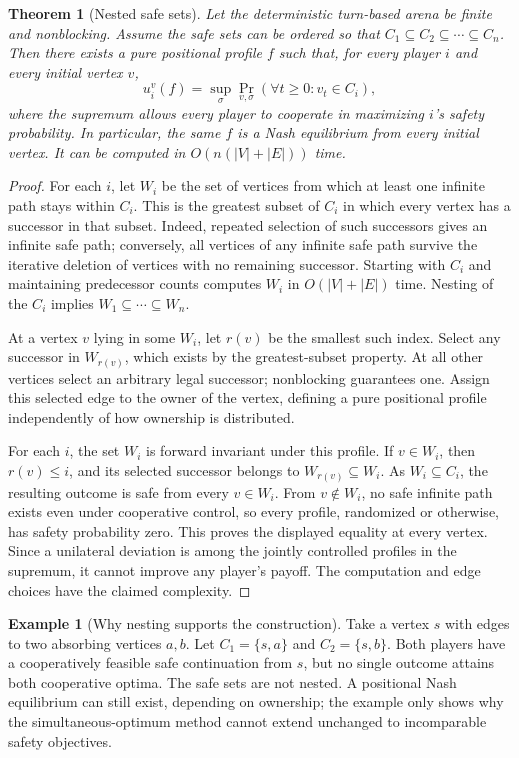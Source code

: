 \documentclass[11pt]{article}
\newtheorem{theorem}{Theorem}
\theoremstyle{definition}
\newtheorem{example}{Example}
\theoremstyle{remark}
\begin{document}
\begin{theorem}[Nested safe sets]
Let the deterministic turn-based arena be finite and nonblocking. Assume the safe sets can be ordered so that $C_1\subseteq C_2\subseteq\cdots\subseteq C_n$. Then there exists a pure positional profile $f$ such that, for every player $i$ and every initial vertex $v$,
\[
 u_i^v(f)=\sup_{\sigma}\Pr_{v,\sigma}(\forall t\geq0:v_t\in C_i),
\]
where the supremum allows every player to cooperate in maximizing $i$'s safety probability. In particular, the same $f$ is a Nash equilibrium from every initial vertex. It can be computed in $O(n(|V|+|E|))$ time.
\end{theorem}
\begin{proof}
For each $i$, let $W_i$ be the set of vertices from which at least one infinite path stays within $C_i$. This is the greatest subset of $C_i$ in which every vertex has a successor in that subset. Indeed, repeated selection of such successors gives an infinite safe path; conversely, all vertices of any infinite safe path survive the iterative deletion of vertices with no remaining successor. Starting with $C_i$ and maintaining predecessor counts computes $W_i$ in $O(|V|+|E|)$ time. Nesting of the $C_i$ implies $W_1\subseteq\cdots\subseteq W_n$.

At a vertex $v$ lying in some $W_i$, let $r(v)$ be the smallest such index. Select any successor in $W_{r(v)}$, which exists by the greatest-subset property. At all other vertices select an arbitrary legal successor; nonblocking guarantees one. Assign this selected edge to the owner of the vertex, defining a pure positional profile independently of how ownership is distributed.

For each $i$, the set $W_i$ is forward invariant under this profile. If $v\in W_i$, then $r(v)\leq i$, and its selected successor belongs to $W_{r(v)}\subseteq W_i$. As $W_i\subseteq C_i$, the resulting outcome is safe from every $v\in W_i$. From $v\notin W_i$, no safe infinite path exists even under cooperative control, so every profile, randomized or otherwise, has safety probability zero. This proves the displayed equality at every vertex. Since a unilateral deviation is among the jointly controlled profiles in the supremum, it cannot improve any player's payoff. The computation and edge choices have the claimed complexity.
\end{proof}

\begin{example}[Why nesting supports the construction]
Take a vertex $s$ with edges to two absorbing vertices $a,b$. Let $C_1=\{s,a\}$ and $C_2=\{s,b\}$. Both players have a cooperatively feasible safe continuation from $s$, but no single outcome attains both cooperative optima. The safe sets are not nested. A positional Nash equilibrium can still exist, depending on ownership; the example only shows why the simultaneous-optimum method cannot extend unchanged to incomparable safety objectives.
\end{example}
\end{document}

